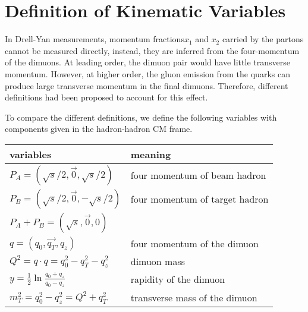 \documentclass[../main.tex]{subfiles}
\begin{document}
\chapter{Definition of Kinematic Variables}
\label{a_ch:kinematic}
In Drell-Yan measurements, momentum fractions$x_1$ and $x_2$ carried by the partons
cannot be measured directly, instead, they are inferred from the
four-momentum of the dimuons. At leading order, the dimuon pair would have little
transverse momentum. However, at higher order, the gluon emission from the quarks
can produce large transverse momentum in the final dimuons. Therefore, different
definitions had been proposed to account for this effect.

To compare the different definitions, we define the following variables with
components given in the hadron-hadron CM frame.
\begin{table}[h!]
	\centering
	\begin{tabular}{l|l}
		variables                                                 & meaning                        \\ \hline
		$P_A = \left(   \sqrt{s}/2, \vec{0}, \sqrt{s}/2 \right)$  & four momentum of beam hadron   \\
		$P_B = \left( \sqrt{s}/2, \vec{0},   -\sqrt{s}/2 \right)$ & four momentum of target hadron \\
		$P_A+P_B=\left(\sqrt{s},\vec{0},0\right)$                 &                                \\
		$q = \left(q_0, \vec{q_T}, q_z\right)$                    & four momentum of the dimuon    \\
		$Q^2=q\cdot q=q_0^2-q_T^2-q_z^2$                          & dimuon mass                    \\
		$y=\frac{1}{2}\ln \frac{q_0 +   q_z}{q_0-q_z}$            & rapidity of the dimuon         \\
		$m_T^2 = q_0^2 - q_z^2=Q^2+q_T^2$                         & transverse mass of the dimuon  \\ \hline
	\end{tabular}
\end{table}
\end{document}
